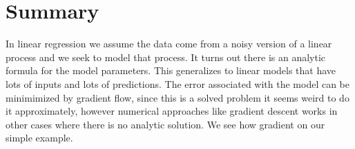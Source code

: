 \documentclass[12pt]{article}
\begin{document}
\section*{Summary}
In linear regression we assume the data come from a noisy version of a
linear process and we seek to model that process. It turns out there
is an analytic formula for the model parameters. This generalizes to
linear models that have lots of inputs and lots of predictions. The
error associated with the model can be minimimized by gradient flow,
since this is a solved problem it seems weird to do it approximately,
however numerical approaches like gradient descent works in other
cases where there is no analytic solution. We see how gradient on our
simple example.
\end{document}
